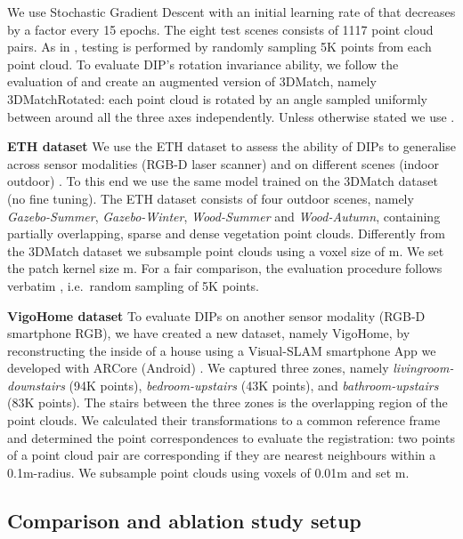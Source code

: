 \documentclass[a4paper,conference]{IEEEtran}
\begin{document}
We use Stochastic Gradient Descent with an initial learning rate of  that decreases by a factor  every 15 epochs.
The eight test scenes consists of 1117 point cloud pairs.
As in \cite{Gojcic2019,Choy2019,Bai2020}, testing is performed by randomly sampling 5K points from each point cloud.
To evaluate DIP's rotation invariance ability, we follow the evaluation of \cite{Gojcic2019} and create an augmented version of 3DMatch, namely 3DMatchRotated: each point cloud is rotated by an angle sampled uniformly between  around all the three axes independently.
Unless otherwise stated we use .

\vspace{1mm}
\noindent \textbf{ETH dataset} 
We use the ETH dataset to assess the ability of DIPs to generalise across sensor modalities (RGB-D  laser scanner) and on different scenes (indoor  outdoor) \cite{Pomerleau2012}.
To this end we use the same model trained on the 3DMatch dataset (no fine tuning).
The ETH dataset consists of four outdoor scenes, namely \emph{Gazebo-Summer}, \emph{Gazebo-Winter}, \emph{Wood-Summer} and \emph{Wood-Autumn}, containing partially overlapping, sparse and dense vegetation point clouds.
Differently from the 3DMatch dataset we subsample point clouds using a voxel size of m.
We set the patch kernel size m.
For a fair comparison, the evaluation procedure follows verbatim \cite{Gojcic2019}, i.e.~random sampling of 5K points.

\vspace{1mm}
\noindent \textbf{VigoHome dataset} 
To evaluate DIPs on another sensor modality (RGB-D  smartphone RGB), we have created a new dataset, namely VigoHome, by reconstructing the inside of a house using a Visual-SLAM smartphone App we developed with ARCore (Android) \cite{arcore}.
We captured three zones, namely \emph{livingroom-downstairs} (94K points), \emph{bedroom-upstairs} (43K points), and \emph{bathroom-upstairs} (83K points).
The stairs between the three zones is the overlapping region of the point clouds.
We calculated their transformations to a common reference frame and determined the point correspondences to evaluate the registration:
two points of a point cloud pair are corresponding if they are nearest neighbours within a 0.1m-radius.
We subsample point clouds using voxels of 0.01m and set m.




\subsection{Comparison and ablation study setup}
\end{document}
